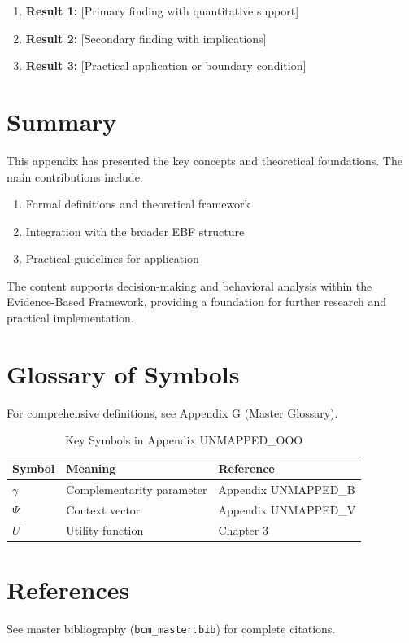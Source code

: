 \begin{enumerate}
    \item \textbf{Result 1:} [Primary finding with quantitative support]
    \item \textbf{Result 2:} [Secondary finding with implications]
    \item \textbf{Result 3:} [Practical application or boundary condition]
\end{enumerate}


\section{Summary}
\label{sec:ooo-summary}

This appendix has presented the key concepts and theoretical foundations.
The main contributions include:

\begin{enumerate}
    \item Formal definitions and theoretical framework
    \item Integration with the broader EBF structure
    \item Practical guidelines for application
\end{enumerate}

The content supports decision-making and behavioral analysis within the
Evidence-Based Framework, providing a foundation for further research
and practical implementation.


\section{Glossary of Symbols}
\label{sec:ooo-glossary}

For comprehensive definitions, see Appendix G (Master Glossary).

\begin{table}[htbp]
\centering
\caption{Key Symbols in Appendix UNMAPPED_OOO}
\begin{tabular}{lll}
\toprule
\textbf{Symbol} & \textbf{Meaning} & \textbf{Reference} \\
\midrule
$\gamma$ & Complementarity parameter & Appendix UNMAPPED_B \\
$\Psi$ & Context vector & Appendix UNMAPPED_V \\
$U$ & Utility function & Chapter 3 \\
\bottomrule
\end{tabular}
\end{table}


\section{References}
\label{sec:references}

See master bibliography (\texttt{bcm\_master.bib}) for complete citations.

\nocite{bcm_master}


